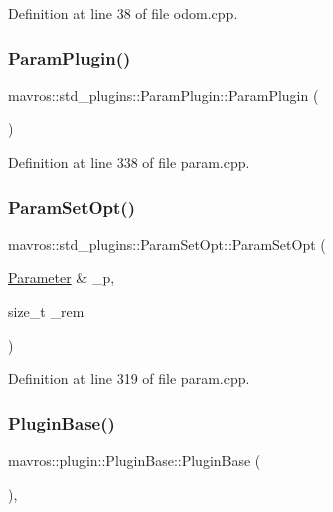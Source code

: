 Definition at line 38 of file odom.\+cpp.

\mbox{\label{group__plugin_ga7c2bfbe1cd5b72b7685ad0b875e935db}} 
\subsubsection{\texorpdfstring{ParamPlugin()}{ParamPlugin()}}
{\footnotesize\ttfamily mavros\+::std\+\_\+plugins\+::\+Param\+Plugin\+::\+Param\+Plugin (\begin{DoxyParamCaption}{ }\end{DoxyParamCaption})\hspace{0.3cm}{\ttfamily [inline]}}



Definition at line 338 of file param.\+cpp.

\mbox{\label{group__plugin_ga5fde2c30705fd08fa9eeee30a882633a}} 
\subsubsection{\texorpdfstring{ParamSetOpt()}{ParamSetOpt()}}
{\footnotesize\ttfamily mavros\+::std\+\_\+plugins\+::\+Param\+Set\+Opt\+::\+Param\+Set\+Opt (\begin{DoxyParamCaption}\item[{\mbox{\hyperlink{classmavros_1_1std__plugins_1_1Parameter}{Parameter}} \&}]{\+\_\+p,  }\item[{size\+\_\+t}]{\+\_\+rem }\end{DoxyParamCaption})\hspace{0.3cm}{\ttfamily [inline]}}



Definition at line 319 of file param.\+cpp.

\mbox{\label{group__plugin_gac37e1a835763608688df9b6b6806917b}} 
\subsubsection{\texorpdfstring{PluginBase()}{PluginBase()}}
{\footnotesize\ttfamily mavros\+::plugin\+::\+Plugin\+Base\+::\+Plugin\+Base (\begin{DoxyParamCaption}{ }\end{DoxyParamCaption})\hspace{0.3cm}{\ttfamily [inline]}, {\ttfamily [protected]}}



